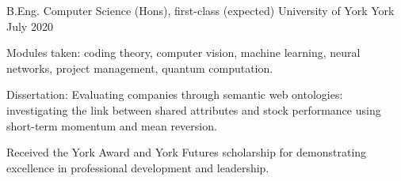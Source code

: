
\begin{cventries}
  \cventry
    {B.Eng. Computer Science (Hons), first-class (expected)} %
    {University of York} %
    {York} %
    {July 2020} %
    {
      \begin{cvitems} %
         \item {Modules taken: coding theory, computer vision, machine learning, neural networks, project management, quantum computation.}
         \vspace{0.5mm}
         \item {Dissertation: Evaluating companies through semantic web ontologies: investigating the link between shared attributes and stock performance using short-term momentum and mean reversion.}
         \vspace{0.5mm}
         \item{Received the York Award and York Futures scholarship for demonstrating excellence in professional development and leadership.}
      \end{cvitems}
    }
\end{cventries}
